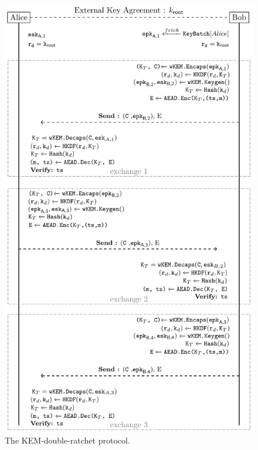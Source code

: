 \begin{figure}
    \centering
\includegraphics[height=\textheight]{kemdr.pdf}
    \caption{The KEM-double-ratchet protocol.}
    \label{DRProt}
\end{figure}

